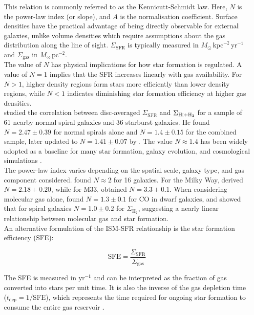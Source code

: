 \noindent This relation is commonly referred to as the Kennicutt-Schmidt law. Here, $N$ is the power-law index (or slope), and $A$ is the normalisation coefficient. Surface densities have the practical advantage of being directly observable for external galaxies, unlike volume densities which require assumptions about the gas distribution along the line of sight. $\Sigma_{\mathrm{SFR}}$ is typically measured in $M_\odot\,\mathrm{kpc}^{-2}\,\mathrm{yr}^{-1}$ and $\Sigma_{\mathrm{gas}}$ in $M_\odot\,\mathrm{pc}^{-2}$.\\\indent
The value of $N$ has physical implications for how star formation is regulated. A value of $N = 1$ implies that the SFR increases linearly with gas availability. For $N > 1$, higher density regions form stars more efficiently than lower density regions, while $N < 1$ indicates diminishing star formation efficiency at higher gas densities.\\\indent
\citet{Kennicutt1998} studied the correlation between disc-averaged $\Sigma_{\mathrm{SFR}}$ and $\Sigma_{\textrm{H\textsc{i}}+\mathrm{H}_2}$ for a sample of 61 nearby normal spiral galaxies and 36 starburst galaxies. He found $N = 2.47 \pm 0.39$ for normal spirals alone and $N = 1.4 \pm 0.15$ for the combined sample, later updated to $N = 1.41 \pm 0.07$ by \citet{delosReyes2019}. The value $N \approx 1.4$ has been widely adopted as a baseline for many star formation, galaxy evolution, and cosmological simulations \citep{SchayetoDalla2008, FOREVER22, FLAMINGO}.\\\indent
The power-law index varies depending on the spatial scale, galaxy type, and gas component considered. \citet{Boissier2003} found $N \approx 2$ for 16 galaxies. For the Milky Way, \citet{Misiriotis2006} derived $N = 2.18 \pm 0.20$, while for M33, \citet{Heyer2004} obtained $N = 3.3 \pm 0.1$. When considering molecular gas alone, \citet{Leroy2005} found $N = 1.3 \pm 0.1$ for CO in dwarf galaxies, and \citet{Fbigiel2008} showed that for spiral galaxies $N = 1.0 \pm 0.2$ for $\Sigma_{\mathrm{H}_2}$, suggesting a nearly linear relationship between molecular gas and star formation.\\\indent
An alternative formulation of the ISM-SFR relationship is the star formation efficiency (SFE):

\begin{equation}
    \mathrm{SFE} = \frac{\Sigma_{\mathrm{SFR}}}{\Sigma_{\mathrm{gas}}}
    \label{eq:sfe}
\end{equation}

\noindent The SFE is measured in yr$^{-1}$ and can be interpreted as the fraction of gas converted into stars per unit time. It is also the inverse of the gas depletion time ($t_{\mathrm{dep}} = 1/\mathrm{SFE}$), which represents the time required for ongoing star formation to consume the entire gas reservoir \citep{Leroy2008, Yu-Hsuan2024}.

